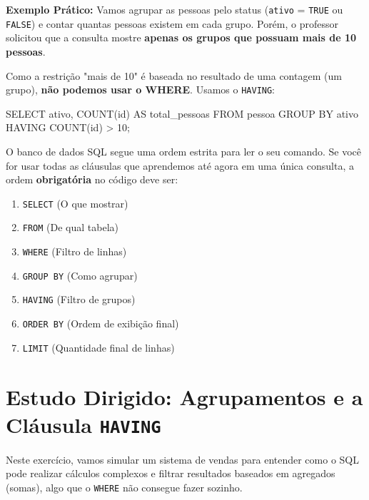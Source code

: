 \documentclass[12pt,a4paper,openright]{book}
\begin{document}
\textbf{Exemplo Prático:} Vamos agrupar as pessoas pelo status (\texttt{ativo} = \texttt{TRUE} ou \texttt{FALSE}) e contar quantas pessoas existem em cada grupo. Porém, o professor solicitou que a consulta mostre \textbf{apenas os grupos que possuam mais de 10 pessoas}. 

Como a restrição "mais de 10" é baseada no resultado de uma contagem (um grupo), \textbf{não podemos usar o WHERE}. Usamos o \texttt{HAVING}:

\begin{sqlcode}
SELECT ativo, COUNT(id) AS total_pessoas
FROM pessoa
GROUP BY ativo
HAVING COUNT(id) > 10;
\end{sqlcode}

\vspace{0.5cm}
\begin{tcolorbox}[colback=red!5,colframe=red!70!black,title=Atenção à Ordem de Execução!]
O banco de dados SQL segue uma ordem estrita para ler o seu comando. Se você for usar todas as cláusulas que aprendemos até agora em uma única consulta, a ordem \textbf{obrigatória} no código deve ser:
\begin{enumerate}
    \item \texttt{SELECT} (O que mostrar)
    \item \texttt{FROM} (De qual tabela)
    \item \texttt{WHERE} (Filtro de linhas)
    \item \texttt{GROUP BY} (Como agrupar)
    \item \texttt{HAVING} (Filtro de grupos)
    \item \texttt{ORDER BY} (Ordem de exibição final)
    \item \texttt{LIMIT} (Quantidade final de linhas)
\end{enumerate}
\end{tcolorbox}



\section{Estudo Dirigido: Agrupamentos e a Cláusula \texttt{HAVING}}

\begin{tcolorbox}[colback=green!5,colframe=green!40!black,title=Objetivo da Atividade]
Neste exercício, vamos simular um sistema de vendas para entender como o SQL pode realizar cálculos complexos e filtrar resultados baseados em agregados (somas), algo que o \texttt{WHERE} não consegue fazer sozinho.
\end{tcolorbox}
\end{document}
